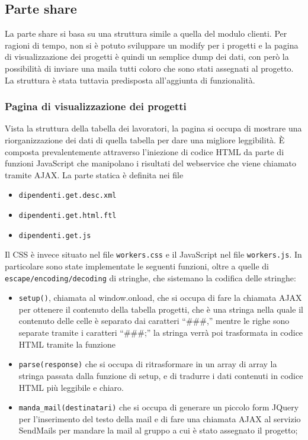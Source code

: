 \subsection{Parte share}
La parte share si basa su una struttura simile a quella del modulo clienti. Per ragioni di tempo, non si è potuto sviluppare un modify per i progetti e la pagina di visualizzazione dei progetti è quindi un semplice dump dei dati, con però la possibilità di inviare una maila  tutti coloro che sono stati assegnati al progetto. La struttura è stata tuttavia predisposta all’aggiunta di funzionalità.

\subsubsection{Pagina di visualizzazione dei progetti}
Vista la struttura della tabella dei lavoratori, la pagina si occupa di mostrare una riorganizzazione dei dati di quella tabella per dare una migliore leggibilità.
È composta prevalentemente attraverso l’iniezione di codice HTML da parte di funzioni JavaScript che manipolano i risultati del webservice che viene chiamato tramite AJAX.
La parte statica è definita nei file
\begin {itemize}
\item \texttt{dipendenti.get.desc.xml}
\item \texttt{dipendenti.get.html.ftl}
\item \texttt{dipendenti.get.js}
\end{itemize}
Il CSS è invece situato nel file \texttt{workers.css}  e il JavaScript nel file \texttt{workers.js}. In particolare sono state implementate le seguenti funzioni, oltre a quelle di \texttt{escape/encoding/decoding} di stringhe, che sistemano la codifica delle stringhe:
\begin{itemize}
\item \texttt{setup()}, chiamata al window.onload, che si occupa di fare la chiamata AJAX per ottenere il contenuto della tabella progetti, che è una stringa nella quale il contenuto delle celle è separato dai caratteri  “\#\#\#,” mentre le righe sono separate tramite i caratteri “\#\#\#;” la stringa verrà poi trasformata in codice HTML tramite la funzione
\item \texttt{parse(response)} che si occupa di ritrasformare in un array di array la stringa passata dalla funzione di setup, e di tradurre i dati contenuti in codice HTML  più leggibile e chiaro.
\item \texttt{manda\_mail(destinatari)} che si occupa di generare un piccolo form JQuery per l'inserimento del testo della mail e di fare una chiamata AJAX al servizio SendMails per mandare la mail al gruppo a cui è stato assegnato il progetto;
\end{itemize}

